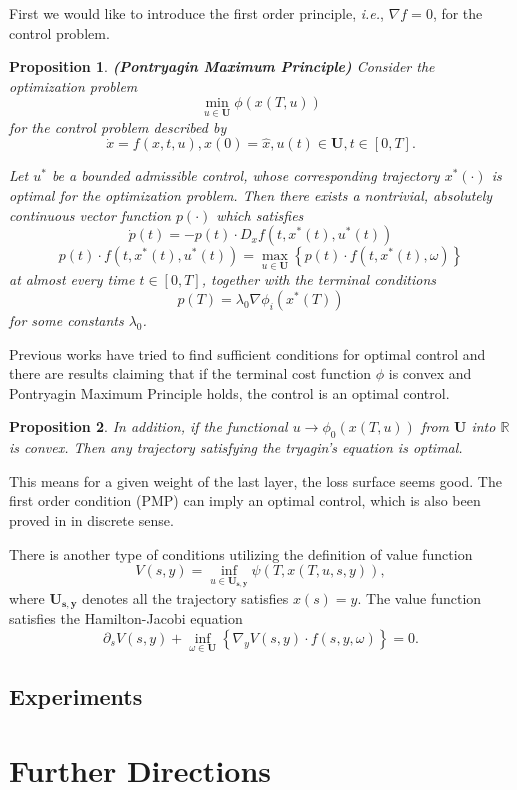 \documentclass{article}
\theoremstyle{plain}
\newtheorem{prop}{Proposition}
\theoremstyle{definition}
\begin{document}
First we would like to introduce the first order principle, \emph{i.e.}, $\nabla f=0$, for the control problem.
\begin{prop}
	\textbf{(Pontryagin Maximum Principle)} Consider the optimization problem $$\min_{u\in\mathbf{U}} \phi(x(T,u))$$ for the control problem described by
	$$\dot x = f(x,t,u),x(0)=\hat{x},u(t)\in\mathbf{U},t\in [0,T].$$

	Let $u^*$ be a bounded admissible control, whose corresponding trajectory $x^*(\cdot)$ is optimal for the optimization problem. Then there exists a nontrivial, absolutely continuous vector function $p(\cdot)$ which satisfies
	$$\dot{p}(t)=-p(t)\cdot D_xf(t,x^*(t),u^*(t))$$
	$$p(t)\cdot f(t,x^*(t),u^*(t))=\max_{u\in\mathbf{U}}\left\{p(t)\cdot f(t,x^*(t),\omega)\right\}$$
	at almost every time $t\in[0,T]$, together with the terminal conditions
	$$p(T)=\lambda_0\nabla\phi_i(x^*(T))$$
	for some constants $\lambda_0$.
\end{prop}

Previous works have tried to find sufficient conditions for optimal control and there are results claiming that if the terminal cost function $\phi$ is convex and Pontryagin Maximum Principle holds, the control is an optimal control.


\begin{prop}
	In addition, if the functional $u\rightarrow \phi_0(x(T,u))$ from $\mathbf{U}$ into $\mathbb{R}$ is convex. Then any trajectory satisfying the tryagin's equation is optimal.
\end{prop}

This means for a given weight of the last layer, the loss surface seems good. The first order condition (PMP) can imply an optimal control, which is also been proved in \cite{bartlett2018representing} in discrete sense.

There is another type of conditions utilizing the definition of value function
$$V(s,y)=\inf_{u\in\mathbf{U_{s,y}}}\psi(T,x(T,u,s,y)),$$
where $\mathbf{U_{s,y}}$ denotes all the trajectory satisfies $x(s)=y$. The value function satisfies the Hamilton-Jacobi equation $$\partial_sV(s,y)+\inf_{\omega\in\mathbf{U}}\left\{\nabla_yV(s,y)\cdot f(s,y,\omega)\right\}=0.$$
\subsection{Experiments}

\section{Further Directions}
\end{document}
